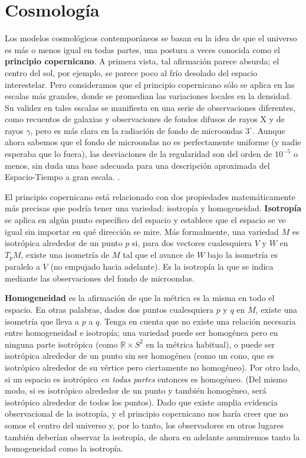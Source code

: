 \documentclass[11pt,b5paper,openany,twoside]{book}
\newcommand{\R}{\mathbb{R}}
\begin{document}
\chapter{Cosmología}


Los modelos cosmológicos contemporáneos se basan en la idea de que el universo es más o menos igual en todas partes, una postura a veces conocida como el {\bf principio copernicano}.
A primera vista, tal afirmación parece absurda; el centro del sol, por ejemplo, se parece poco al frío desolado del espacio interestelar.
Pero consideramos que el principio copernicano sólo se aplica en las escalas más grandes, donde se promedian las variaciones locales en la densidad.
Su validez en tales escalas se manifiesta en una serie de observaciones diferentes, como recuentos de galaxias y observaciones de fondos difusos de rayos X y de rayos $\gamma$, pero es más clara en la radiación de fondo de microondas $3^\circ$.
Aunque ahora sabemos que el fondo de microondas no es perfectamente uniforme (y nadie esperaba que lo fuera), las desviaciones de la regularidad son del orden de $10^{-5}$ o menos, sin duda una base adecuada para una descripción aproximada del Espacio-Tiempo a gran escala. .

El principio copernicano está relacionado con dos propiedades matemáticamente más precisas que podría tener una variedad: isotropía y homogeneidad.
{\bf Isotropía} se aplica en algún punto específico del espacio y establece que el espacio se ve igual sin importar en qué dirección se mire.
Más formalmente, una variedad $M$ es isotrópica alrededor de un punto $p$ si, para dos vectores cualesquiera $V$ y $W$ en $T_pM$, existe una isometría de $M$ tal que el avance de $W$ bajo la isometría es paralelo a $V$ (no empujado hacia adelante).
Es la isotropía la que se indica mediante las observaciones del fondo de microondas.

{\bf Homogeneidad} es la afirmación de que la métrica es la misma en todo el espacio.
En otras palabras, dados dos puntos cualesquiera $p$ y $q$ en $M$, existe una isometría que lleva a $p$ a $q$.
Tenga en cuenta que no existe una relación necesaria entre homogeneidad e isotropía; una variedad puede ser homogénea pero en ninguna parte isotrópica (como $\R\times S^2$ en la métrica habitual), o puede ser isotrópica alrededor de un punto sin ser homogénea (como un cono, que es isotrópico alrededor de su vértice pero ciertamente no homogéneo).
Por otro lado, si un espacio es isotrópico {\it en todas partes} entonces es homogéneo.
(Del mismo modo, si es isotrópico alrededor de un punto y también homogéneo, será isotrópico alrededor de todos los puntos).
Dado que existe amplia evidencia observacional de la isotropía, y el principio copernicano nos haría creer que no somos el centro del universo y, por lo tanto, los observadores en otros lugares también deberían observar la isotropía, de ahora en adelante asumiremos tanto la homogeneidad como la isotropía.
\end{document}

